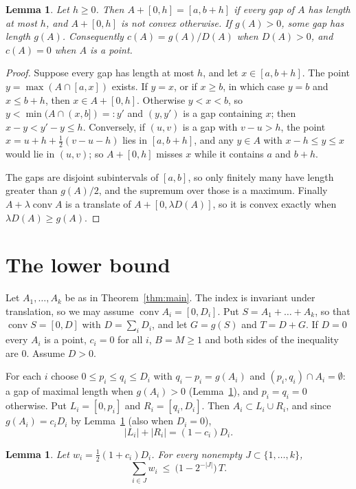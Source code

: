 \documentclass[11pt]{amsart}
\newtheorem{lemma}[theorem]{Lemma}
\theoremstyle{remark}
\DeclareMathOperator{\conv}{conv}
\begin{document}
\begin{lemma}\label{lem:gap}
Let $h\ge0$. Then $A+[0,h]=[a,b+h]$ if every gap of $A$ has length at most $h$, and $A+[0,h]$ is not convex otherwise.
If $g(A)>0$, some gap has length $g(A)$. Consequently $c(A)=g(A)/D(A)$ when $D(A)>0$, and $c(A)=0$ when $A$ is a point.
\end{lemma}

\begin{proof}
Suppose every gap has length at most $h$, and let $x\in[a,b+h]$. The point $y=\max(A\cap[a,x])$ exists. If $y=x$, or if
$x\ge b$, in which case $y=b$ and $x\le b+h$, then $x\in A+[0,h]$. Otherwise $y<x<b$, so $y<\min(A\cap(x,b])=:y'$ and $(y,y')$ is a gap containing $x$; then
$x-y<y'-y\le h$. Conversely, if $(u,v)$ is a gap with $v-u>h$, the point $x=u+h+\tfrac12(v-u-h)$ lies in
$[a,b+h]$, and any $y\in A$ with $x-h\le y\le x$ would lie in $(u,v)$; so $A+[0,h]$ misses $x$ while it contains $a$
and $b+h$.

The gaps are disjoint subintervals of $[a,b]$, so only finitely many have length greater than
$g(A)/2$, and the supremum over those is a maximum. Finally $A+\lambda\conv A$ is a translate of $A+[0,\lambda D(A)]$,
so it is convex exactly when $\lambda D(A)\ge g(A)$.
\end{proof}

\section{The lower bound}

Let $A_1,\dots,A_k$ be as in Theorem~\ref{thm:main}. The index is invariant under translation, so we may assume
$\conv A_i=[0,D_i]$. Put $S=A_1+\dots+A_k$, so that $\conv S=[0,D]$ with $D=\sum_iD_i$, and let $G=g(S)$ and $T=D+G$.
If $D=0$ every $A_i$ is a point, $c_i=0$ for all $i$, $B=M\ge1$ and both sides of the inequality are $0$. Assume $D>0$.

For each $i$ choose $0\le p_i\le q_i\le D_i$ with $q_i-p_i=g(A_i)$ and $(p_i,q_i)\cap A_i=\emptyset$: a gap of
maximal length when $g(A_i)>0$ (Lemma~\ref{lem:gap}), and $p_i=q_i=0$ otherwise. Put $L_i=[0,p_i]$ and
$R_i=[q_i,D_i]$. Then $A_i\subset L_i\cup R_i$, and since $g(A_i)=c_iD_i$ by Lemma~\ref{lem:gap} (also when $D_i=0$),
\begin{equation}\label{eq:sides}
  |L_i|+|R_i|=(1-c_i)D_i .
\end{equation}

\begin{lemma}\label{lem:cover}
Let $w_i=\tfrac12(1+c_i)D_i$. For every nonempty $J\subset\{1,\dots,k\}$,
\[
  \sum_{i\in J}w_i\ \le\ \bigl(1-2^{-|J|}\bigr)\,T .
\]
\end{lemma}
\end{document}
